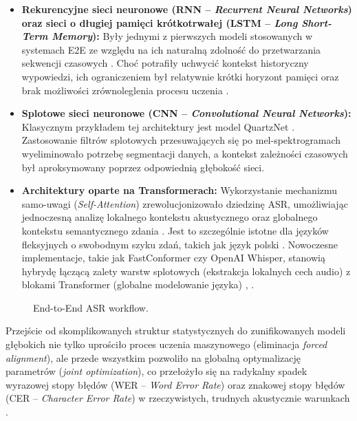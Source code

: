 \begin{itemize}
\item \textbf{Rekurencyjne sieci neuronowe (RNN -- \textit{Recurrent Neural Networks}) oraz sieci o długiej pamięci krótkotrwałej (LSTM -- \textit{Long Short-Term Memory}):} Były jednymi z pierwszych modeli stosowanych w systemach E2E ze względu na ich naturalną zdolność do przetwarzania sekwencji czasowych \cite[s.~315--316]{pondel2024e2e}. Choć potrafiły uchwycić kontekst historyczny wypowiedzi, ich ograniczeniem był relatywnie krótki horyzont pamięci oraz brak możliwości zrównoleglenia procesu uczenia \cite[s.~315--316]{pondel2024e2e}.

\item \textbf{Splotowe sieci neuronowe (CNN -- \textit{Convolutional Neural Networks}):} Klasycznym przykładem tej architektury jest model QuartzNet \cite[s.~316]{pondel2024e2e}. Zastosowanie filtrów splotowych przesuwających się po mel-spektrogramach wyeliminowało potrzebę segmentacji danych, a kontekst zależności czasowych był aproksymowany poprzez odpowiednią głębokość sieci.

\item \textbf{Architektury oparte na Transformerach:} Wykorzystanie mechanizmu samo-uwagi (\textit{Self-Attention}) zrewolucjonizowało dziedzinę ASR, umożliwiając jednoczesną analizę lokalnego kontekstu akustycznego oraz globalnego kontekstu semantycznego zdania \cite[s.~315--316]{pondel2024e2e}. Jest to szczególnie istotne dla języków fleksyjnych o swobodnym szyku zdań, takich jak język polski \cite[s.~315--316]{pondel2024e2e}. Nowoczesne implementacje, takie jak FastConformer czy OpenAI Whisper, stanowią hybrydę łączącą zalety warstw splotowych (ekstrakcja lokalnych cech audio) z blokami Transformer (globalne modelowanie języka) \cite[s.~316]{pondel2024e2e}, \cite[s.~2--3]{ferraro2023benchmarking}.
\end{itemize}
\begin{figure}[htbp]
    \centering
    
    \caption{End-to-End ASR workflow.}
    \label{fig:endtoend_asr}
\end{figure}
Przejście od skomplikowanych struktur statystycznych do zunifikowanych modeli głębokich nie tylko uprościło proces uczenia maszynowego (eliminacja \textit{forced alignment}), ale przede wszystkim pozwoliło na globalną optymalizację parametrów (\textit{joint optimization}), co przełożyło się na radykalny spadek wyrazowej stopy błędów (WER -- \textit{Word Error Rate}) oraz znakowej stopy błędów (CER -- \textit{Character Error Rate}) w rzeczywistych, trudnych akustycznie warunkach \cite[s.~315--317]{pondel2024e2e}.


